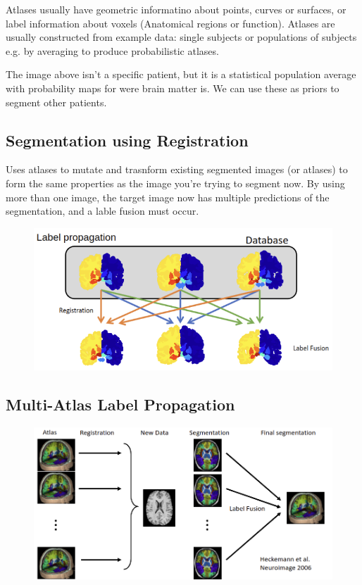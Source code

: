 \documentclass[11pt]{article}
\begin{document}
Atlases usually have geometric informatino about points, curves or surfaces, or label information about voxels (Anatomical regions or function). Atlases are usually constructed from example data: single subjects or populations of subjects e.g. by averaging to produce probabilistic atlases.

The image above isn't a specific patient, but it is a statistical population average with probability maps for were brain matter is. We can use these as priors to segment other patients. 

\subsection{Segmentation using Registration}

Uses atlases to mutate and trasnform existing segmented images (or atlases) to form the same properties as the image you're trying to segment now. By using more than one image, the target image now has multiple predictions of the segmentation, and a lable fusion must occur.

\begin{figure}[H]
    \centering
    \includegraphics[width=.6\linewidth]{figures/registration.png}
\end{figure}

\subsection{Multi-Atlas Label Propagation}

\begin{figure}[H]
    \centering
    \includegraphics[width=.6\linewidth]{figures/registration-2.png}
\end{figure}
\end{document}
